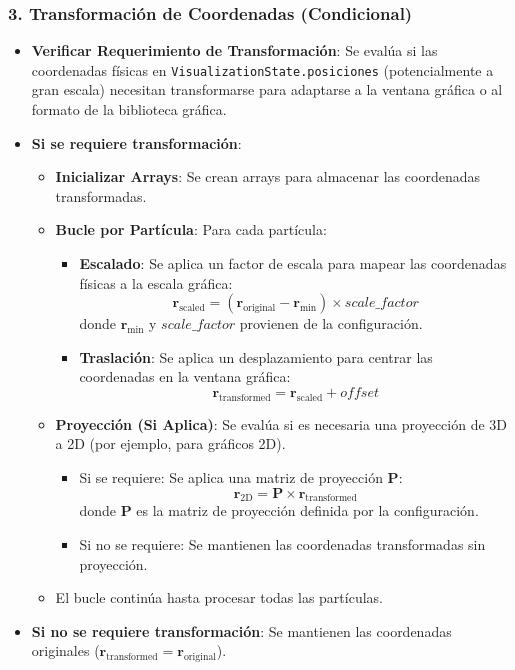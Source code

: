 \subsubsection*{3. Transformación de Coordenadas (Condicional)}
\begin{itemize}
    \item \textbf{Verificar Requerimiento de Transformación}: Se evalúa si las coordenadas físicas en \texttt{VisualizationState.posiciones} (potencialmente a gran escala) necesitan transformarse para adaptarse a la ventana gráfica o al formato de la biblioteca gráfica.
    \item \textbf{Si se requiere transformación}:
    \begin{itemize}
        \item \textbf{Inicializar Arrays}: Se crean arrays para almacenar las coordenadas transformadas.
        \item \textbf{Bucle por Partícula}: Para cada partícula:
        \begin{itemize}
            \item \textbf{Escalado}: Se aplica un factor de escala para mapear las coordenadas físicas a la escala gráfica:
            \[
            \mathbf{r}_{\text{scaled}} = (\mathbf{r}_{\text{original}} - \mathbf{r}_{\text{min}}) \times scale\_factor
            \]
            donde $\mathbf{r}_{\text{min}}$ y $scale\_factor$ provienen de la configuración.
            \item \textbf{Traslación}: Se aplica un desplazamiento para centrar las coordenadas en la ventana gráfica:
            \[
            \mathbf{r}_{\text{transformed}} = \mathbf{r}_{\text{scaled}} + offset
            \]
        \end{itemize}
        \item \textbf{Proyección (Si Aplica)}: Se evalúa si es necesaria una proyección de 3D a 2D (por ejemplo, para gráficos 2D).
        \begin{itemize}
            \item Si se requiere: Se aplica una matriz de proyección $\mathbf{P}$:
            \[
            \mathbf{r}_{\text{2D}} = \mathbf{P} \times \mathbf{r}_{\text{transformed}}
            \]
            donde $\mathbf{P}$ es la matriz de proyección definida por la configuración.
            \item Si no se requiere: Se mantienen las coordenadas transformadas sin proyección.
        \end{itemize}
        \item El bucle continúa hasta procesar todas las partículas.
    \end{itemize}
    \item \textbf{Si no se requiere transformación}: Se mantienen las coordenadas originales ($\mathbf{r}_{\text{transformed}} = \mathbf{r}_{\text{original}}$).
\end{itemize}


